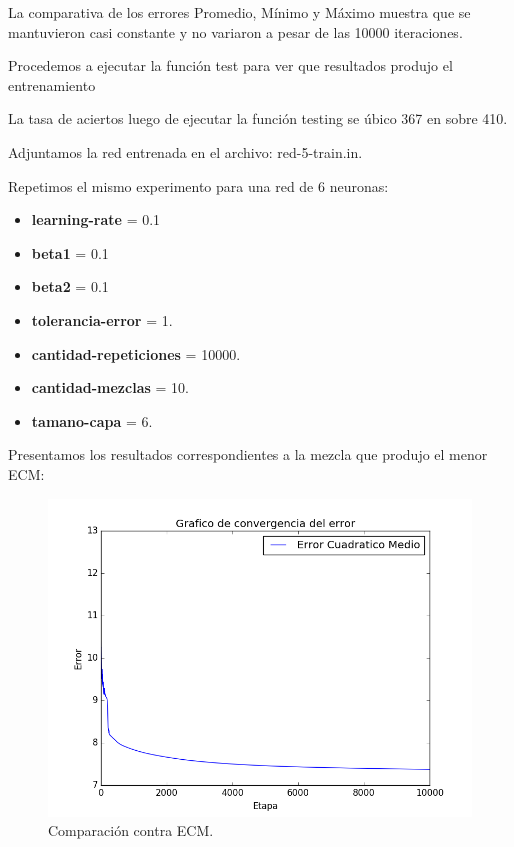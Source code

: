 \documentclass[onecolumn,10pt]{article}
\begin{document}
La comparativa de los errores Promedio, Mínimo y Máximo muestra que se mantuvieron
casi constante y no variaron a pesar de las 10000 iteraciones.

Procedemos a ejecutar la función test para ver que resultados produjo el entrenamiento 

La tasa de aciertos luego de ejecutar la función testing se úbico 367 en sobre 410.

Adjuntamos la red entrenada en el archivo: red-5-train.in.



Repetimos el mismo experimento para una red de 6 neuronas:

\begin{itemize}
\item \textbf{learning-rate} = 0.1
\item \textbf{beta1} = 0.1
\item \textbf{beta2} = 0.1
\item \textbf{tolerancia-error} = 1.
\item \textbf{cantidad-repeticiones} = 10000.
\item \textbf{cantidad-mezclas} = 10.
\item \textbf{tamano-capa} = 6.
\end{itemize}


Presentamos los resultados correspondientes a la mezcla que produjo
el menor ECM:

\begin{figure}[H]
  \centering
  \includegraphics[width=0.8\columnwidth]{red_6_ecm.png}
  \caption{Comparación contra ECM.}
  \label{fig:red 6 ECM}
\end{figure}
\end{document}
